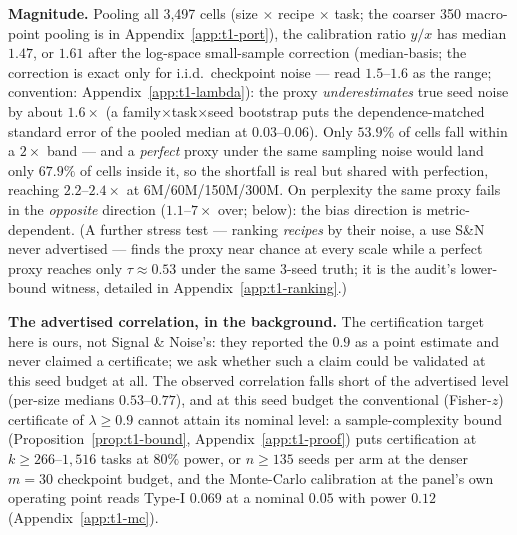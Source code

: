 \textbf{Magnitude.} Pooling all 3{,}497 cells
(size $\times$ recipe $\times$ task; the coarser 350 macro-point pooling is in Appendix~\ref{app:t1-port}), the
calibration ratio $y/x$ has median $1.47$, or $1.61$ after the log-space small-sample
correction (median-basis; the correction is exact only for i.i.d.\ checkpoint noise ---
read $1.5$--$1.6$ as the range; convention: Appendix~\ref{app:t1-lambda}): the proxy \emph{underestimates} true
seed noise by about $1.6\times$ (a family$\times$task$\times$seed bootstrap puts the dependence-matched standard error of the pooled median at $0.03$--$0.06$). Only $53.9\%$ of
cells fall within a $2\times$ band --- and a \emph{perfect}
proxy under the same sampling noise would land only $67.9\%$ of cells inside it, so the
shortfall is real but shared with perfection,
reaching
$2.2$--$2.4\times$ at 6M/60M/150M/300M. On perplexity the same proxy fails in the
\emph{opposite} direction ($1.1$--$7\times$ over; below): the bias direction
is metric-dependent. (A further stress test --- ranking \emph{recipes} by their noise, a use
S\&N never advertised --- finds the proxy near chance at every scale while a perfect proxy
reaches only $\tau \approx 0.53$ under the same 3-seed truth; it is the audit's
lower-bound witness, detailed in Appendix~\ref{app:t1-ranking}.)

\textbf{The advertised correlation, in the background.} The certification target here is
ours, not Signal \& Noise's: they reported the $0.9$ as a point estimate and never claimed a
certificate; we ask whether such a claim could be validated at this seed budget at all. The observed correlation falls short
of the advertised level (per-size medians $0.53$--$0.77$), and at this seed budget the
conventional (Fisher-$z$) certificate of $\lambda \ge 0.9$ cannot attain its nominal level:
a sample-complexity bound
(Proposition~\ref{prop:t1-bound}, Appendix~\ref{app:t1-proof}) puts certification at
$k \ge 266$--$1{,}516$ tasks at $80\%$ power, or $n \ge 135$ seeds per arm at the denser
$m{=}30$ checkpoint budget, and the Monte-Carlo calibration at the
panel's own operating point reads Type-I $0.069$ at a nominal $0.05$ with power $0.12$
(Appendix~\ref{app:t1-mc}).

